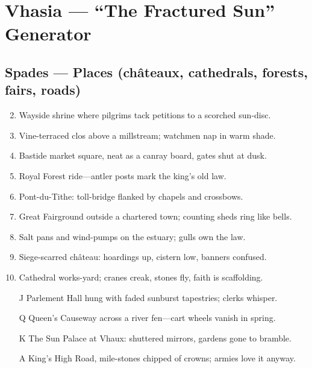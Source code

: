\chapter{Vhasia --- ``The Fractured Sun'' Generator}

\section*{Spades --- Places (châteaux, cathedrals, forests, fairs, roads)}
\begin{enumerate}
\setcounter{enumi}{1}
\item Wayside shrine where pilgrims tack petitions to a scorched sun-disc.
\item Vine-terraced clos above a millstream; watchmen nap in warm shade.
\item Bastide market square, neat as a canray board, gates shut at dusk.
\item Royal Forest ride---antler posts mark the king's old law.
\item Pont-du-Tithe: toll-bridge flanked by chapels and crossbows.
\item Great Fairground outside a chartered town; counting sheds ring like bells.
\item Salt pans and wind-pumps on the estuary; gulls own the law.
\item Siege-scarred château: hoardings up, cistern low, banners confused.
\item Cathedral works-yard; cranes creak, stones fly, faith is scaffolding.
\item[J] Parlement Hall hung with faded sunburst tapestries; clerks whisper.
\item[Q] Queen's Causeway across a river fen---cart wheels vanish in spring.
\item[K] The Sun Palace at Vhaux: shuttered mirrors, gardens gone to bramble.
\item[A] King's High Road, mile-stones chipped of crowns; armies love it anyway.
\end{enumerate}

